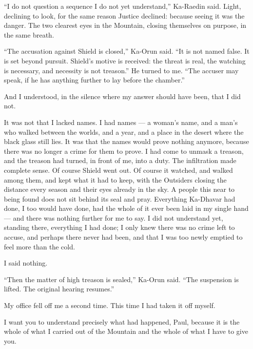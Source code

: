 ``I do not question a sequence I do not yet understand,'' Ka-Raedin said. Light, declining to look, for the same reason Justice declined: because seeing it was the danger. The two clearest eyes in the Mountain, closing themselves on purpose, in the same breath.\par
 
``The accusation against Shield is closed,'' Ka-Orun said. ``It is not named false. It is set beyond pursuit. Shield's motive is received: the threat is real, the watching is necessary, and necessity is not treason.'' He turned to me. ``The accuser may speak, if he has anything further to lay before the chamber.''\par
 
And I understood, in the silence where my answer should have been, that I did not.\par
 
It was not that I lacked names. I had names — a woman's name, and a man's who walked between the worlds, and a year, and a place in the desert where the black glass still lies. It was that the names would prove nothing anymore, because there was no longer a crime for them to prove. I had come to unmask a treason, and the treason had turned, in front of me, into a duty. The infiltration made complete sense. Of course Shield went out. Of course it watched, and walked among them, and kept what it had to keep, with the Outsiders closing the distance every season and their eyes already in the sky. A people this near to being found does not sit behind its seal and pray. Everything Ka-Dhavar had done, I too would have done, had the whole of it ever been laid in my single hand — and there was nothing further for me to say. I did not understand yet, standing there, everything I had done; I only knew there was no crime left to accuse, and perhaps there never had been, and that I was too newly emptied to feel more than the cold.\par
 
I said nothing.\par
 
``Then the matter of high treason is sealed,'' Ka-Orun said. ``The suspension is lifted. The original hearing resumes.''\par
 
My office fell off me a second time. This time I had taken it off myself.\par
 
\ornament
 
I want you to understand precisely what had happened, Paul, because it is the whole of what I carried out of the Mountain and the whole of what I have to give you.\par
 
